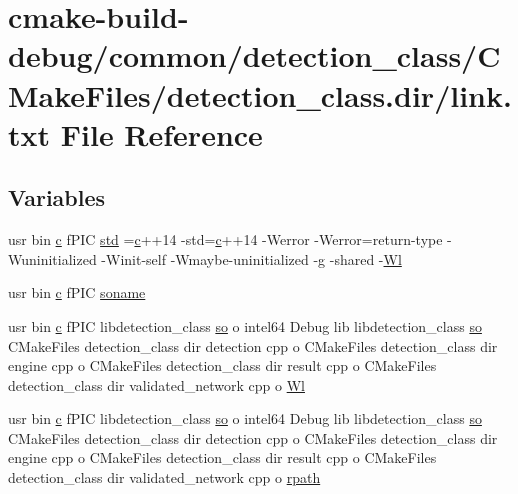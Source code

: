 \hypertarget{common_2detection__class_2CMakeFiles_2detection__class_8dir_2link_8txt}{}\section{cmake-\/build-\/debug/common/detection\+\_\+class/\+C\+Make\+Files/detection\+\_\+class.dir/link.txt File Reference}
\label{common_2detection__class_2CMakeFiles_2detection__class_8dir_2link_8txt}
\subsection*{Variables}
\begin{DoxyCompactItemize}
\item 
usr bin \hyperlink{CMakeCache_8txt_aac1d6a1710812201527c735f7c6afbaa}{c} f\+P\+IC \hyperlink{common_2detection__class_2CMakeFiles_2detection__class_8dir_2link_8txt_a5f87c8f8e33670f7c8c5221b6be1bcc4}{std} =\hyperlink{CMakeCache_8txt_aac1d6a1710812201527c735f7c6afbaa}{c}++14 -\/std=\hyperlink{CMakeCache_8txt_aac1d6a1710812201527c735f7c6afbaa}{c}++14 -\/Werror -\/Werror=return-\/type -\/Wuninitialized -\/Winit-\/self -\/Wmaybe-\/uninitialized -\/g -\/shared -\/\hyperlink{thirdparty_2extension_2CMakeFiles_2cpu__extension_8dir_2link_8txt_af9ccbf658ed2deb89d0d79f211e5b033}{Wl}
\item 
usr bin \hyperlink{CMakeCache_8txt_aac1d6a1710812201527c735f7c6afbaa}{c} f\+P\+IC \hyperlink{common_2detection__class_2CMakeFiles_2detection__class_8dir_2link_8txt_ab65a9b6457c4853ed17f89f945516e66}{soname}
\item 
usr bin \hyperlink{CMakeCache_8txt_aac1d6a1710812201527c735f7c6afbaa}{c} f\+P\+IC libdetection\+\_\+class \hyperlink{CMakeCache_8txt_aa98797039f48d335ee715de4cd92852f}{so} o intel64 Debug lib libdetection\+\_\+class \hyperlink{CMakeCache_8txt_aa98797039f48d335ee715de4cd92852f}{so} C\+Make\+Files detection\+\_\+class dir detection cpp o C\+Make\+Files detection\+\_\+class dir engine cpp o C\+Make\+Files detection\+\_\+class dir result cpp o C\+Make\+Files detection\+\_\+class dir validated\+\_\+network cpp o \hyperlink{common_2detection__class_2CMakeFiles_2detection__class_8dir_2link_8txt_a16e5b6a1eb1badb1e1aa75864f169965}{Wl}
\item 
usr bin \hyperlink{CMakeCache_8txt_aac1d6a1710812201527c735f7c6afbaa}{c} f\+P\+IC libdetection\+\_\+class \hyperlink{CMakeCache_8txt_aa98797039f48d335ee715de4cd92852f}{so} o intel64 Debug lib libdetection\+\_\+class \hyperlink{CMakeCache_8txt_aa98797039f48d335ee715de4cd92852f}{so} C\+Make\+Files detection\+\_\+class dir detection cpp o C\+Make\+Files detection\+\_\+class dir engine cpp o C\+Make\+Files detection\+\_\+class dir result cpp o C\+Make\+Files detection\+\_\+class dir validated\+\_\+network cpp o \hyperlink{common_2detection__class_2CMakeFiles_2detection__class_8dir_2link_8txt_a431a205935ef768f370ce3847e9175fa}{rpath}
\end{DoxyCompactItemize}


